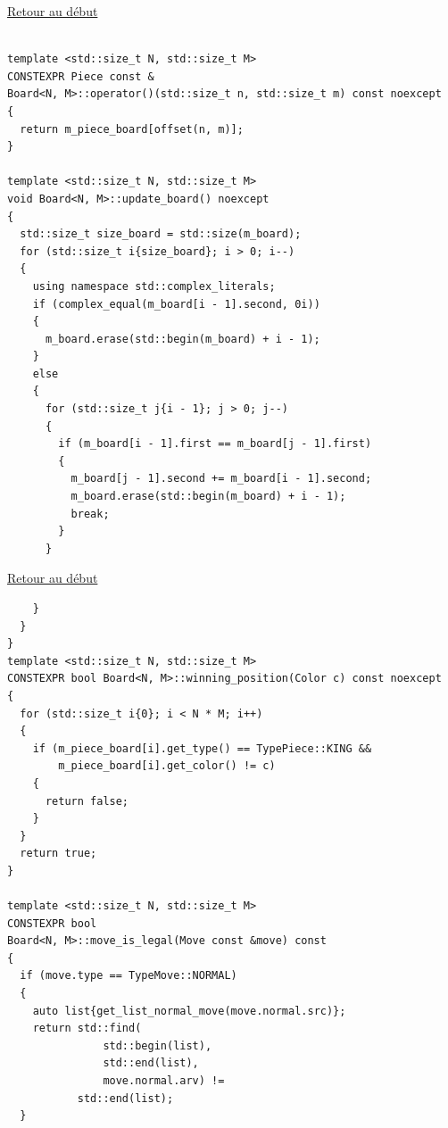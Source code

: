 {\begin{frame}[fragile]
\hyperlink{conclusion}{Retour au début}\newline
\begin{verbatim}

template <std::size_t N, std::size_t M>
CONSTEXPR Piece const &
Board<N, M>::operator()(std::size_t n, std::size_t m) const noexcept
{
  return m_piece_board[offset(n, m)];
}

template <std::size_t N, std::size_t M>
void Board<N, M>::update_board() noexcept
{
  std::size_t size_board = std::size(m_board);
  for (std::size_t i{size_board}; i > 0; i--)
  {
    using namespace std::complex_literals;
    if (complex_equal(m_board[i - 1].second, 0i))
    {
      m_board.erase(std::begin(m_board) + i - 1);
    }
    else
    {
      for (std::size_t j{i - 1}; j > 0; j--)
      {
        if (m_board[i - 1].first == m_board[j - 1].first)
        {
          m_board[j - 1].second += m_board[i - 1].second;
          m_board.erase(std::begin(m_board) + i - 1);
          break;
        }
      }
\end{verbatim}
\end{frame}

\begin{frame}[fragile]
\hyperlink{conclusion}{Retour au début}\newline
\begin{verbatim}
    }
  }
}
template <std::size_t N, std::size_t M>
CONSTEXPR bool Board<N, M>::winning_position(Color c) const noexcept
{
  for (std::size_t i{0}; i < N * M; i++)
  {
    if (m_piece_board[i].get_type() == TypePiece::KING &&
        m_piece_board[i].get_color() != c)
    {
      return false;
    }
  }
  return true;
}

template <std::size_t N, std::size_t M>
CONSTEXPR bool
Board<N, M>::move_is_legal(Move const &move) const
{
  if (move.type == TypeMove::NORMAL)
  {
    auto list{get_list_normal_move(move.normal.src)};
    return std::find(
               std::begin(list),
               std::end(list),
               move.normal.arv) !=
           std::end(list);
  }
\end{verbatim}
\end{frame}

}
